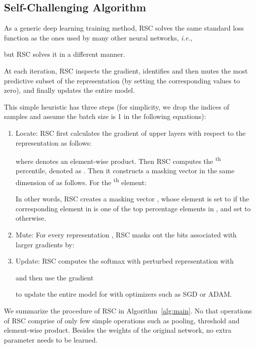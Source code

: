 \documentclass[runningheads]{llncs}
\newcommand{\method}{RSC}
\begin{document}
\subsection{Self-Challenging Algorithm}
As a generic deep learning training method, \method{} solves the same standard loss function as the ones used by many other neural networks, \textit{i.e.},

but \method{} solves it in a different manner. 

At each iteration, \method{} inspects the gradient, 
identifies and then 
mutes the most predictive subset of the representation  
(by setting the corresponding values to zero), 
and finally updates the entire model. 

This simple heuristic has three steps (for simplicity, we drop the indices of samples and assume the batch size is 1 in the following equations):
\begin{enumerate}
    \item Locate: \method{} first calculates the gradient of upper layers with respect to the representation as follows: 
    
    where  denotes an element-wise product. 
    Then \method{} computes the \textsuperscript{th} percentile, denoted as . 
    Then it constructs a masking vector  in the same dimension of  as follows. For the \textsuperscript{th} element:
    
    In other words, \method{} creates a masking vector , whose element is set to  if the corresponding element in  is one of the top  percentage elements in , and set to  otherwise. 
    \item Mute: For every representation , \method{} masks out the bits associated with larger gradients by:
    
    \item Update: \method{} computes the softmax with perturbed representation with
    
    and then use the gradient 
    
    to update the entire model for  with optimizers such as SGD or ADAM. 
\end{enumerate}

We summarize the procedure of \method{} in Algorithm~\ref{alg:main}. No that operations of \method{} comprise of only few simple operations such as pooling, threshold and element-wise product. Besides the weights of the original network, no extra parameter needs to be learned. 
 
\end{document}
